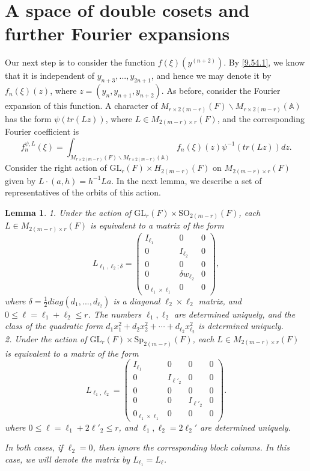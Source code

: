 \documentclass[12pts]{amsart}
\newcommand{\BA}{{\mathbb {A}}}
\newcommand{\GL}{{\mathrm{GL}}}
\newcommand{\SO}{{\mathrm{SO}}}
\newcommand{\Sp}{{\mathrm{Sp}}}
\newtheorem{lem}[thm]{Lemma}
\begin{document}
\section{A space of double cosets and further Fourier expansions}



Our next step is to consider the function $f(\xi)(y^{(n+2)})$. By \eqref{9.54.1}, we know that it is independent of $y_{n+3},...,y_{2n+1}$, and hence we may denote it by $f_n(\xi)(z)$, where $z=(y_n,y_{n+1},y_{n+2})$. As before, consider the Fourier expansion of this function. A character of $M_{r\times 2(m-r)}(F)\backslash M_{r\times 2(m-r)}(\BA)$ has the form $\psi(tr(Lz))$, where $L\in M_{2(m-r)\times r}(F)$, and the corresponding Fourier coefficient is 
\begin{equation}\label{9.56}
f_n^{\psi,L}(\xi)=\int_{M_{r\times 2(m-r)}(F)\backslash M_{r\times 2(m-r)}(\BA)}f_n(\xi)(z)\psi^{-1}(tr(Lz))dz.
\end{equation}
Consider the right action of $\GL_r(F)\times H_{2(m-r)}(F)$ on $M_{2(m-r)\times r}(F)$ given by $L\cdot (a,h)=h^{-1}La$. In the next lemma, we describe a set of representatives of the orbits of this action.
\begin{lem}\label{lem 9.3}
	1. Under the action of $\GL_r(F)\times \SO_{2(m-r)}(F)$, each $L\in
	M_{2(m-r)\times r}(F)$ is equivalent to a matrix of the form
	$$
	L_{\ell_1,\ell_2;\delta}=\begin{pmatrix}I_{\ell_1}&0&0\\0&I_{\ell_2}&0\\0&0&0\\0&\delta
	w_{\ell_2}&0\\0_{\ell_1\times \ell_1}&0&0\end{pmatrix},
	$$
	where $\delta=\frac{1}{2}diag (d_1,...,d_{\ell_2})$ is a diagonal $\ell_2\times\ell_2$ matrix, and $0\leq
	\ell=\ell_1+\ell_2\leq r$. The numbers $\ell_1, \ell_2$ are determined uniquely, and the class of the quadratic form $d_1x_1^2+d_2x_2^2+\cdots+d_{\ell_2}x_{\ell_2}^2$ is determined uniquely. \\
	2. Under the action of $\GL_r(F)\times \Sp_{2(m-r)}(F)$, each $L\in
	M_{2(m-r)\times r}(F)$ is equivalent to a matrix of the form
	$$
	L_{\ell_1,\ell_2}=\begin{pmatrix}I_{\ell_1}&0&0&0\\0&I_{\ell'_2}&0&0\\0&0&0&0\\0&0&I_{\ell'_2}&0\\0_{\ell_1\times \ell_1}&0&0&0\end{pmatrix}.
	$$
	where $0\leq \ell=\ell_1+2\ell'_2\leq r$, and $\ell_1, \ell_2=2\ell_2'$ are determined uniquely.
	
	In both cases, if $\ell_2=0$, then ignore the corresponding
	block columns. In this case, we will denote the matrix by
	$L_{\ell_1}=L_\ell$. 
\end{lem}
\end{document}
